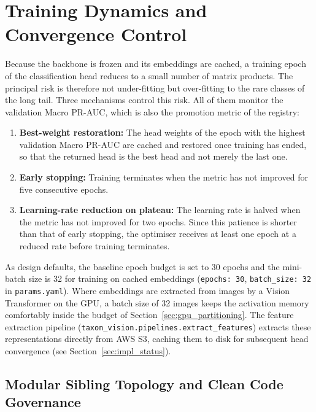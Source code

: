 \section{Training Dynamics and Convergence Control}
\label{sec:training_dynamics}

Because the backbone is frozen and its embeddings are cached, a training epoch of the classification head reduces to a small number of matrix products. The principal risk is therefore not under-fitting but over-fitting to the rare classes of the long tail. Three mechanisms control this risk. All of them monitor the validation Macro PR-AUC, which is also the promotion metric of the registry:
\begin{enumerate}
    \item \textbf{Best-weight restoration:} The head weights of the epoch with the highest validation Macro PR-AUC are cached and restored once training has ended, so that the returned head is the best head and not merely the last one.
    \item \textbf{Early stopping:} Training terminates when the metric has not improved for five consecutive epochs.
    \item \textbf{Learning-rate reduction on plateau:} The learning rate is halved when the metric has not improved for two epochs. Since this patience is shorter than that of early stopping, the optimiser receives at least one epoch at a reduced rate before training terminates.
\end{enumerate}

As design defaults, the baseline epoch budget is set to 30 epochs and the mini-batch size is 32 for training on cached embeddings (\texttt{epochs: 30}, \texttt{batch\_size: 32} in \nolinkurl{params.yaml}). Where embeddings are extracted from images by a Vision Transformer on the GPU, a batch size of 32 images keeps the activation memory comfortably inside the budget of Section~\ref{sec:gpu_partitioning}. The feature extraction pipeline (\texttt{taxon\_vision.pipelines.extract\_features}) extracts these representations directly from AWS S3, caching them to disk for subsequent head convergence (see Section~\ref{sec:impl_status}).

\subsection{Modular Sibling Topology and Clean Code Governance}
\label{sec:sibling_training_topology}

